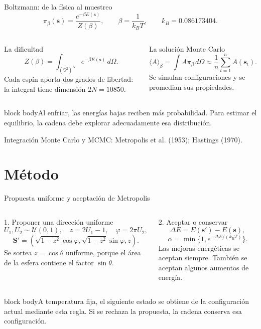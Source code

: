 \documentclass[aspectratio=169,10pt]{beamer}
\newcommand{\idea}[1]{\vspace{2pt}\begin{beamercolorbox}[rounded=true,sep=5pt,wd=\linewidth]{block body}\small #1\end{beamercolorbox}}
\newcommand{\fuente}[1]{{\fontsize{6.5}{8}\selectfont\color{black!60}#1\par}}
\begin{document}
\begin{frame}{Boltzmann: de la física al muestreo}
\[
\pi_\beta(\mathbf s)=\frac{e^{-\beta E(\mathbf s)}}{Z(\beta)},\qquad
\beta=\frac1{k_BT},\qquad k_B=0.086173404.
\]
\begin{columns}[T,onlytextwidth]
\begin{block}{La dificultad}
\[
Z(\beta)=\int_{(\mathbb S^2)^N} e^{-\beta E(\mathbf s)}\,d\Omega.
\]
Cada espín aporta dos grados de libertad: la integral tiene dimensión $2N=10850$.
\end{block}
\begin{block}{La solución Monte Carlo}
\[
\langle A\rangle_\beta=\int A\pi_\beta\,d\Omega
\approx\frac1n\sum_{t=1}^n A(\mathbf s_t).
\]
Se simulan configuraciones y se promedian sus propiedades.
\end{block}
\end{columns}
\idea{Al enfriar, las energías bajas reciben más probabilidad. Para estimar el equilibrio, la cadena debe explorar adecuadamente esa distribución.}
\fuente{Integración Monte Carlo y MCMC: Metropolis et al. (1953); Hastings (1970).}
\end{frame}

\section{Método}
\begin{frame}{Propuesta uniforme y aceptación de Metropolis}
\begin{columns}[T,onlytextwidth]
\begin{block}{1. Proponer una dirección uniforme}
\[
U_1,U_2\sim\mathcal U(0,1),\quad z=2U_1-1,\quad\varphi=2\pi U_2,
\]
\[
\mathbf S'=\left(\sqrt{1-z^2}\cos\varphi,\sqrt{1-z^2}\sin\varphi,z\right).
\]
\small Se sortea $z=\cos\theta$ uniforme, porque el área de la esfera contiene el factor $\sin\theta$.
\end{block}
\begin{block}{2. Aceptar o conservar}
\[
\Delta E=E(\mathbf s')-E(\mathbf s),
\]
\[
\alpha=\min\{1,e^{-\Delta E/(k_BT)}\}.
\]
\small Las mejoras energéticas se aceptan siempre. También se aceptan algunos aumentos de energía.
\end{block}
\end{columns}
\idea{A temperatura fija, el siguiente estado se obtiene de la configuración actual mediante esta regla. Si se rechaza la propuesta, la cadena conserva esa configuración.}
\end{frame}
\end{document}
